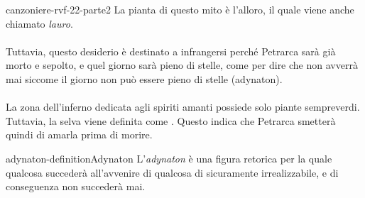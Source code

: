 \documentclass[preview]{standalone}
\begin{document}
\begin{snippet}{canzoniere-rvf-22-parte2}
    La pianta di questo mito è l'alloro, il quale viene anche chiamato \textit{lauro}.
    \\\\
     Tuttavia, questo desiderio è destinato a infrangersi perché Petrarca sarà già morto
    e sepolto, e quel giorno sarà pieno di stelle, come per dire che non avverrà mai siccome
    il giorno non può essere pieno di stelle (adynaton).
    \\\\
    La zona dell'inferno dedicata agli spiriti amanti possiede solo piante sempreverdi.
    Tuttavia, la selva viene definita come .
    Questo indica che Petrarca smetterà quindi di amarla prima di morire.
\end{snippet}

\begin{snippetdefinition}{adynaton-definition}{Adynaton}
    L'\textit{adynaton} è una figura retorica per la quale qualcosa succederà all'avvenire
    di qualcosa di sicuramente irrealizzabile, e di conseguenza non succederà mai.
\end{snippetdefinition}
\end{document}
